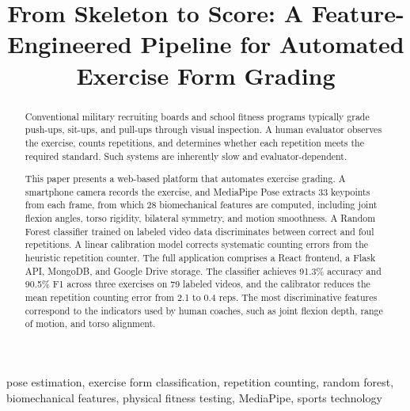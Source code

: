 \documentclass[conference]{IEEEtran}
\begin{document}
\title{From Skeleton to Score: A Feature-Engineered Pipeline for Automated Exercise Form Grading\\
}

\author{
\and
{}
}

\maketitle

\begin{abstract}
Conventional military recruiting boards and school fitness programs typically grade push-ups, sit-ups, and pull-ups through visual inspection. A human evaluator observes the exercise, counts repetitions, and determines whether each repetition meets the required standard. Such systems are inherently slow and evaluator-dependent.

This paper presents a web-based platform that automates exercise grading. A smartphone camera records the exercise, and MediaPipe Pose extracts 33 keypoints from each frame, from which 28 biomechanical features are computed, including joint flexion angles, torso rigidity, bilateral symmetry, and motion smoothness. A Random Forest classifier trained on labeled video data discriminates between correct and foul repetitions. A linear calibration model corrects systematic counting errors from the heuristic repetition counter. The full application comprises a React frontend, a Flask API, MongoDB, and Google Drive storage. The classifier achieves 91.3\% accuracy and 90.5\% F1 across three exercises on 79 labeled videos, and the calibrator reduces the mean repetition counting error from 2.1 to 0.4 reps. The most discriminative features correspond to the indicators used by human coaches, such as joint flexion depth, range of motion, and torso alignment.
\end{abstract}

\begin{IEEEkeywords}
pose estimation, exercise form classification, repetition counting, random forest, biomechanical features, physical fitness testing, MediaPipe, sports technology
\end{IEEEkeywords}
\end{document}

